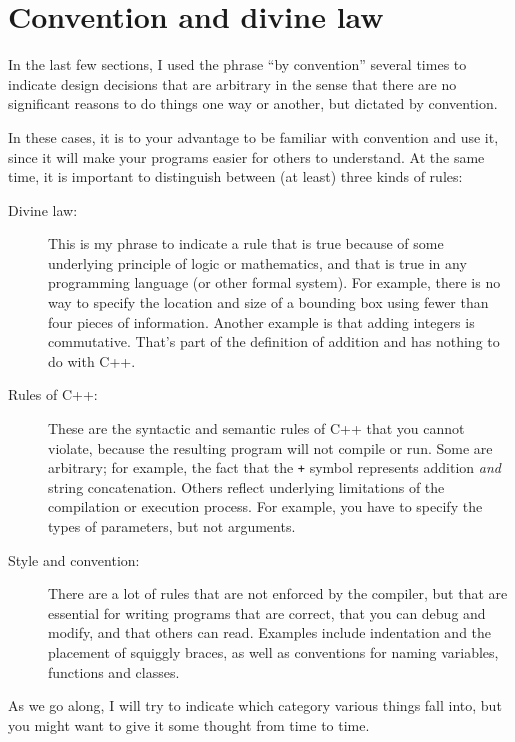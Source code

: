 \section{Convention and divine law}

In the last few sections, I used the phrase ``by convention''
several times to indicate design decisions that are arbitrary
in the sense that there are no significant reasons to do things
one way or another, but dictated by convention.

In these cases, it is to your advantage to be familiar with
convention and use it, since it will make your programs easier
for others to understand.  At the same time, it is important to
distinguish between (at least) three kinds of rules:

\begin{description}

\item[Divine law:]  This is my phrase to indicate a rule that
is true because of some underlying principle of logic or
mathematics, and that is true in any programming language
(or other formal system).  For example, there is no way to
specify the location and size of a bounding box using fewer
than four pieces of information.  Another example is that adding
integers is commutative.  That's part of the definition of
addition and has nothing to do with C++.

\item[Rules of C++:]  These are the syntactic and semantic
rules of C++ that you cannot violate, because the
resulting program will not compile or run.  Some are arbitrary;
for example, the fact that the {\tt +} symbol represents
addition {\em and} string concatenation.  Others reflect
underlying limitations of the compilation or execution process.
For example, you have to specify the types of parameters, but
not arguments.

\item[Style and convention:]  There are a lot of rules that
are not enforced by the compiler, but that are essential for
writing programs that are correct, that you can debug and
modify, and that others can read.  Examples include indentation
and the placement of squiggly braces, as well as conventions
for naming variables, functions and classes.

\end{description}

As we go along, I will try to indicate which category various things
fall into, but you might want to give it some thought from time to
time.

